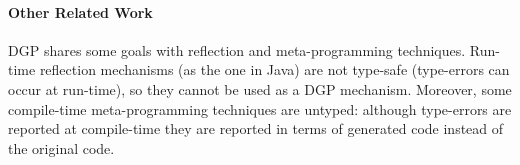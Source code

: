 \documentclass[preprint]{sigplanconf}
\begin{document}
\paragraph{Other Related Work}

DGP shares some goals with
reflection and meta-programming techniques.
Run-time reflection mechanisms (as the one in Java) are
not type-safe (type-errors can occur at run-time), so they cannot be
used as a DGP mechanism. Moreover, some compile-time meta-programming
techniques are untyped: although type-errors are reported at
compile-time they are reported in terms of generated code instead of
the original code.

\cite{TemplateYourBoilerplate}
\cite{Pickling}
\cite{SYB}









% 




\end{document}
